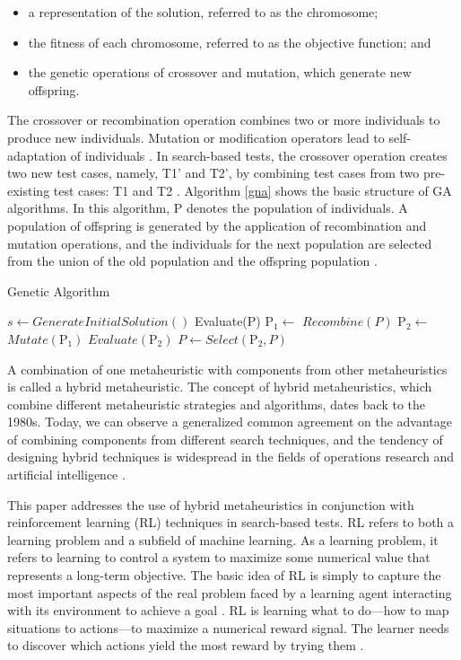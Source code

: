 \documentclass{bmcart}
\begin{document}
\begin{itemize}
\item a representation of the solution, referred to as the chromosome;
\item the fitness of each chromosome, referred to as the objective function; and
\item the genetic operations of crossover and mutation, which generate new offspring. 
\end{itemize}

The crossover or recombination operation combines two or more individuals to produce new individuals. Mutation or modification operators lead to self-adaptation of individuals \cite{Blum2003}. In search-based tests, the crossover operation creates two new test cases, namely, T1' and T2', by combining test cases from two pre-existing test cases: T1 and T2 \cite{Aleti2016}. Algorithm \ref{gna} shows the basic structure of GA algorithms. In this algorithm, P denotes the population of individuals. A population of offspring is generated by the application of recombination and mutation operations, and the individuals for the next population are selected from the union of the old population and the offspring population \citep{raidl2010metaheuristic}.


\begin{algorithm}[h]
  \caption{Genetic Algorithm}\label{gna}
  \begin{algorithmic}[1]
    
    \State $s\gets GenerateInitialSolution()$
    \State Evaluate(P)
    \State $\mbox{P}_1\gets$ $Recombine(P)$
    \State $\mbox{P}_2\gets$ $Mutate(\mbox{P}_1)$ 
    \State $Evaluate(\mbox{P}_2)$
    \State $P\gets Select(\mbox{P}_2,P)$
    \EndWhile
      
  \end{algorithmic}
\end{algorithm}

A combination of one metaheuristic with components from other metaheuristics is called a hybrid metaheuristic. The concept of hybrid metaheuristics, which combine different metaheuristic strategies and algorithms, dates back to the 1980s. Today, we can observe a generalized common agreement on the advantage of combining components from different search techniques, and the tendency of designing hybrid techniques is widespread in the fields of operations research and artificial intelligence \citep{raidl2010metaheuristic}. 


This paper addresses the use of hybrid metaheuristics in conjunction with reinforcement learning (RL) techniques in search-based tests. RL refers to both a learning problem and a subfield of machine learning. As a learning problem, it refers to learning to control a system to maximize some numerical value that represents a long-term objective. The basic idea of RL  is simply to capture the most important aspects of the real problem faced by a learning agent interacting with its environment to achieve a goal \citep{Sutton2012}. RL is learning what to do--–how to map situations to actions–--to maximize a numerical reward signal. The learner needs to discover which actions yield the most reward by trying them \citep{Sutton2012}.
\end{document}
